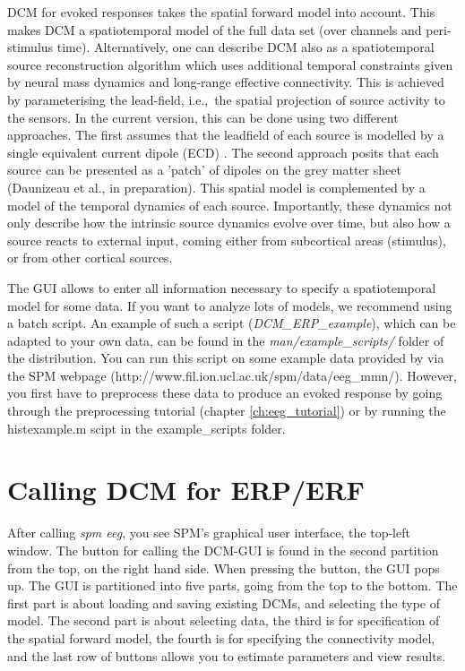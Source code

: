 DCM for evoked responses takes the spatial forward model into
account. This makes DCM a spatiotemporal model of the full data set
(over channels and peri-stimulus time). Alternatively, one can
describe DCM also as a spatiotemporal source reconstruction algorithm which uses
additional temporal constraints given by neural mass dynamics and
long-range effective connectivity. This is achieved by parameterising
the lead-field, i.e.,~the spatial projection of source 
activity to the sensors. In the current version, this can be done
using two different approaches. The first assumes that the leadfield
of each source is modelled by a single equivalent current dipole 
(ECD) \cite{sjk_dcm_erp}. The second approach posits that each source
can be presented as a 'patch' of dipoles on the grey matter sheet
(Daunizeau et al., in preparation). This spatial model is complemented
by a model of the temporal dynamics of each source. Importantly, these
dynamics not only describe how the intrinsic source dynamics evolve
over time, but also how a source reacts to external input, coming
either from subcortical areas (stimulus), or from other cortical
sources.

The GUI allows to enter all information necessary to specify a
spatiotemporal model for some data. If you want to analyze lots of
models, we recommend using a batch script. An example of such 
a script (\textit{DCM\_ERP\_example}), which can be adapted to your
own data, can be found in the \textit{man/example\_scripts/} folder of
the distribution. You can run this script on some example data provided by via the SPM webpage (http://www.fil.ion.ucl.ac.uk/spm/data/eeg\_mmn/). However, you first have to preprocess these data to produce an evoked response by going through the preprocessing tutorial (chapter \ref{ch:eeg_tutorial}) or by running the histexample.m scipt in the example\_scripts folder.

\section{Calling DCM for ERP/ERF}
After calling \textit{spm eeg}, you see SPM's graphical user interface,
the top-left window. The button for calling the DCM-GUI is found
in the second partition from the top, on the right hand side. When
pressing the button, the GUI pops up. The GUI is partitioned into five 
parts, going from the top to the bottom. The first part is about
loading and saving existing DCMs, and selecting the type of model. The second part is about selecting
data, the third is for specification of the spatial forward model, the
fourth is for specifying the connectivity model, and the last row of
buttons allows you to estimate parameters and view results.

